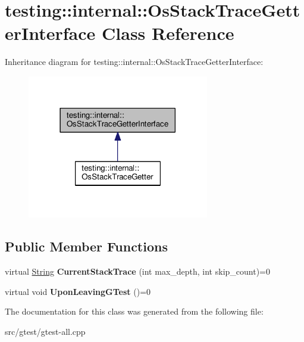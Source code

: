 \hypertarget{classtesting_1_1internal_1_1_os_stack_trace_getter_interface}{}\section{testing\+:\+:internal\+:\+:Os\+Stack\+Trace\+Getter\+Interface Class Reference}
\label{classtesting_1_1internal_1_1_os_stack_trace_getter_interface}


Inheritance diagram for testing\+:\+:internal\+:\+:Os\+Stack\+Trace\+Getter\+Interface\+:
\nopagebreak
\begin{figure}[H]
\begin{center}
\leavevmode
\includegraphics[width=225pt]{classtesting_1_1internal_1_1_os_stack_trace_getter_interface__inherit__graph}
\end{center}
\end{figure}
\subsection*{Public Member Functions}
\begin{DoxyCompactItemize}
\item 
\mbox{\label{classtesting_1_1internal_1_1_os_stack_trace_getter_interface_ac8cb5eb539c3da9d236213d495057735}} 
virtual \mbox{\hyperlink{classtesting_1_1internal_1_1_string}{String}} {\bfseries Current\+Stack\+Trace} (int max\+\_\+depth, int skip\+\_\+count)=0
\item 
\mbox{\label{classtesting_1_1internal_1_1_os_stack_trace_getter_interface_a791bd120428b5a53d5eeba1b27296a39}} 
virtual void {\bfseries Upon\+Leaving\+G\+Test} ()=0
\end{DoxyCompactItemize}


The documentation for this class was generated from the following file\+:\begin{DoxyCompactItemize}
\item 
src/gtest/gtest-\/all.\+cpp\end{DoxyCompactItemize}
